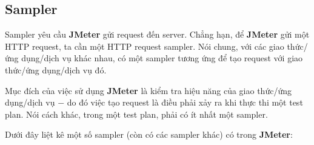 \documentclass[10pt]{report}
\newcommand{\jmeter}{\textbf{JMeter}}
\begin{document}
\subsection{Sampler}

\par Sampler yêu cầu \jmeter{} gửi request đến server. Chẳng hạn, để \jmeter{} gửi một HTTP request, ta cần một HTTP request sampler. Nói chung, với các giao thức/ứng dụng/dịch vụ khác nhau, có một sampler tương ứng để tạo request với giao thức/ứng dụng/dịch vụ đó.

\par Mục đích của việc sử dụng \jmeter{} là kiểm tra hiệu năng của giao thức/ứng dụng/dịch vụ $-$ do đó việc tạo request là điều phải xảy ra khi thực thi một test plan. Nói cách khác, trong một test plan, phải có ít nhất một sampler.

\par Dưới đây liệt kê một số sampler (còn có các sampler khác) có trong \jmeter{}:
\end{document}
